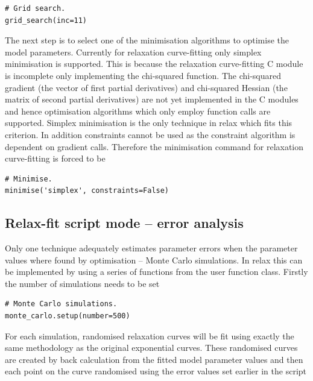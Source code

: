 \begin{lstlisting}[firstnumber=62]
# Grid search.
grid_search(inc=11)
\end{lstlisting}

The next step is to select one of the minimisation algorithms to optimise the model parameters.
Currently for relaxation curve-fitting only simplex minimisation is supported.
This is because the relaxation curve-fitting C module is incomplete only implementing the chi-squared function.
The chi-squared gradient (the vector of first partial derivatives) and chi-squared Hessian (the matrix of second partial derivatives) are not yet implemented in the C modules and hence optimisation algorithms which only employ function calls are supported.
Simplex minimisation is the only technique in relax which fits this criterion.
In addition constraints cannot be used as the constraint algorithm is dependent on gradient calls.
Therefore the minimisation command for relaxation curve-fitting is forced to be

\begin{lstlisting}[firstnumber=65]
# Minimise.
minimise('simplex', constraints=False)
\end{lstlisting}




\subsection{Relax-fit script mode -- error analysis}

Only one technique adequately estimates parameter errors when the parameter values where found by optimisation -- Monte Carlo simulations.
In relax this can be implemented by using a series of functions from the  user function class.
Firstly the number of simulations needs to be set

\begin{lstlisting}[firstnumber=68]
# Monte Carlo simulations.
monte_carlo.setup(number=500)
\end{lstlisting}

For each simulation, randomised relaxation curves will be fit using exactly the same methodology as the original exponential curves.
These randomised curves are created by back calculation from the fitted model parameter values and then each point on the curve randomised using the error values set earlier in the script

